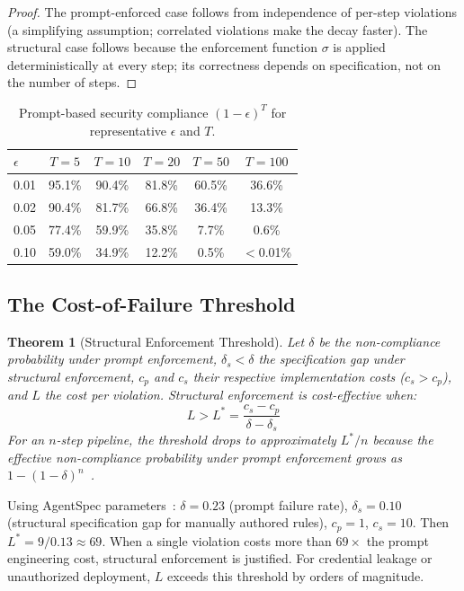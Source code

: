 \documentclass[11pt, a4paper, copyright]{googledeepmind}
\newtheorem{theorem}{Theorem}[section]
\begin{document}
\begin{proof}
The prompt-enforced case follows from independence of per-step violations (a simplifying assumption; correlated violations make the decay faster). The structural case follows because the enforcement function $\sigma$ is applied deterministically at every step; its correctness depends on specification, not on the number of steps.
\end{proof}

\begin{table}[h]
\centering
\caption{Prompt-based security compliance $(1-\epsilon)^T$ for representative $\epsilon$ and $T$.}
\label{tab:decay}
\begin{tabular}{lccccc}
\toprule
$\epsilon$ & $T=5$ & $T=10$ & $T=20$ & $T=50$ & $T=100$ \\
\midrule
0.01 & 95.1\% & 90.4\% & 81.8\% & 60.5\% & 36.6\% \\
0.02 & 90.4\% & 81.7\% & 66.8\% & 36.4\% & 13.3\% \\
0.05 & 77.4\% & 59.9\% & 35.8\% & 7.7\% & 0.6\% \\
0.10 & 59.0\% & 34.9\% & 12.2\% & 0.5\% & $<$0.01\% \\
\bottomrule
\end{tabular}
\end{table}

\subsection{The Cost-of-Failure Threshold}

\begin{theorem}[Structural Enforcement Threshold]
\label{thm:threshold}
Let $\delta$ be the non-compliance probability under prompt enforcement, $\delta_s < \delta$ the specification gap under structural enforcement, $c_p$ and $c_s$ their respective implementation costs ($c_s > c_p$), and $L$ the cost per violation. Structural enforcement is cost-effective when:
\begin{equation}
L > L^* = \frac{c_s - c_p}{\delta - \delta_s}
\end{equation}
For an $n$-step pipeline, the threshold drops to approximately $L^*/n$ because the effective non-compliance probability under prompt enforcement grows as $1-(1-\delta)^n$~\citep{pillar-reliability}.
\end{theorem}

Using AgentSpec parameters~\citep{wang2026agentspec}: $\delta = 0.23$ (prompt failure rate), $\delta_s = 0.10$ (structural specification gap for manually authored rules), $c_p = 1$, $c_s = 10$. Then $L^* = 9/0.13 \approx 69$. When a single violation costs more than $69\times$ the prompt engineering cost, structural enforcement is justified. For credential leakage or unauthorized deployment, $L$ exceeds this threshold by orders of magnitude.
\end{document}
